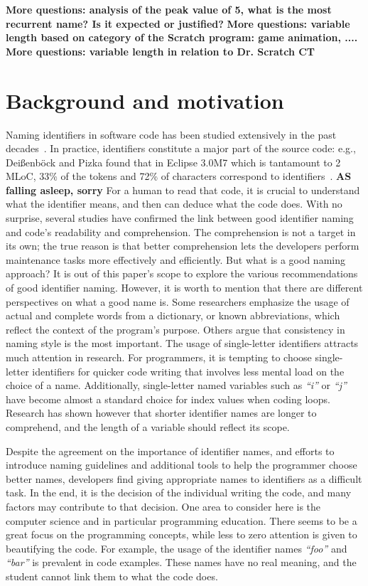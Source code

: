 \documentclass[conference]{IEEEtran}
\newcommand{\todo}[1]{ \textbf{#1} }
\newcommand{\quotes}[1]{\textit{``#1''}}
\begin{document}
\todo{More questions: analysis of the peak value of 5, what is the most recurrent name? Is it expected or justified?}
\todo{More questions: variable length based on category of the Scratch program: game animation, ....}
\todo{More questions: variable length in relation to Dr. Scratch CT}
 
\section{Background and motivation}
Naming identifiers in software code has been studied extensively in the past decades~\cite{AmanASK15,AnquetilL98,AvidanF17,Beniamini,ButlerWYS10,CaprileT00,HofmeisterSH17,LawrieMFB07,LunguK13,ScannielloR13,TakangGM96,TramontanaRS14}. 
In practice, identifiers constitute a major part of the source code: e.g., Dei{\ss}enb{\"o}ck and Pizka found that in Eclipse 3.0M7 which is tantamount to 2 MLoC, 33\% of the tokens and 72\% of characters correspond to identifiers~\cite{Deissenbock}. 
\todo{AS falling asleep, sorry}
For a human to read that code, it is crucial to understand what the identifier means, and then can deduce what the code does. 
With no surprise, several studies have confirmed the link between good identifier naming and code's readability and comprehension. 
The comprehension is not a target in its own; the true reason is that better comprehension lets the developers perform maintenance tasks more effectively and efficiently.
But what is a good naming approach? 
It is out of this paper's scope to explore the various recommendations of good identifier naming. 
However, it is worth to mention that there are different perspectives on what a good name is. 
Some researchers emphasize the usage of actual and complete words from a dictionary, or known abbreviations, which reflect the context of the program's purpose. 
Others argue that consistency in naming style is the most important. 
The usage of single-letter identifiers attracts much attention in research. 
For programmers, it is tempting to choose single-letter identifiers for quicker code writing that involves less mental load on the choice of a name. 
Additionally, single-letter named variables such as \quotes{i} or \quotes{j} have become almost a standard choice for index values when coding loops. 
Research has shown however that shorter identifier names are longer to comprehend, and the length of a variable should reflect its scope. 

Despite the agreement on the importance of identifier names, and efforts to introduce naming guidelines and additional tools to help the programmer choose better names, developers find giving appropriate names to identifiers as a difficult task. In the end, it is the decision of the individual writing the code, and many factors may contribute to that decision. One area to consider here is the computer science and in particular programming education. There seems to be a great focus on the programming concepts, while less to zero attention is given to beautifying the code. For example, the usage of the identifier names \quotes{foo} and \quotes{bar} is prevalent in code examples. These names have no real meaning, and the student cannot link them to what the code does.  
\end{document}
